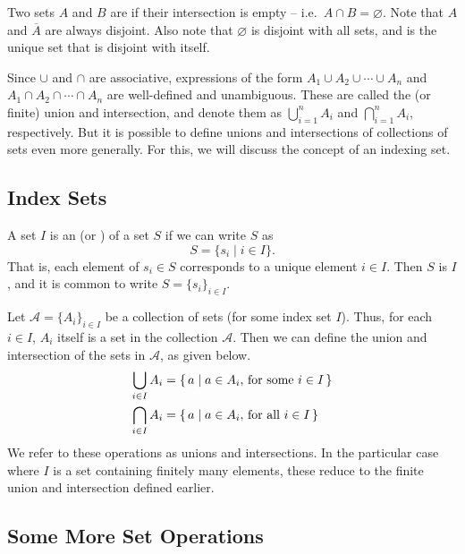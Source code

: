 Two sets $A$ and $B$ are  if their intersection is empty -- i.e.\ $A \cap B = \varnothing$. Note that $A$ and $\overline A$ are always disjoint. Also note that $\varnothing$ is disjoint with all sets, and is the unique set that is disjoint with itself.

Since $\cup$ and $\cap$ are associative, expressions of the form $A_1 \cup A_2 \cup \cdots \cup A_n$ and $A_1 \cap A_2 \cap \cdots \cap A_n$ are well-defined and unambiguous. These are called the  (or finite) union and intersection, and denote them as $\bigcup_{i=1}^n A_i$ and $\bigcap_{i=1}^n A_i$, respectively. But it is possible to define unions and intersections of collections of sets even more generally. For this, we will discuss the concept of an indexing set.

\subsection{Index Sets}\label{subsec:IndexSets}

A set $I$ is an  (or ) of a set $S$ if we can write $S$ as
\begin{equation*}
S = \{ s_i \mid i \in I\}.
\end{equation*}
That is, each element of $s_i \in S$ corresponds to a unique element $i \in I$. Then $S$ is  $I$, and it is common to write $S = \{ s_i \}_{i \in I}$.

Let $\mathcal A = \{ A_i \}_{i \in I}$ be a collection of sets (for some index set $I$). Thus, for each $i \in I$, $A_i$ itself is a set in the collection $\mathcal A$. Then we can define the union and intersection of the sets in $\mathcal A$, as given below.
\begin{align*}
\bigcup_{i \in I} A_i & = \qty{\, a \mid a \in A_i,\, \text{for some}~i \in I \,} \\
\bigcap_{i \in I} A_i & = \qty{\, a \mid a \in A_i,\, \text{for all}~ i \in I \,}
\end{align*}
We refer to these operations as  unions and intersections. In the particular case where $I$ is a set containing finitely many elements, these reduce to the finite union and intersection defined earlier.

\subsection{Some More Set Operations}\label{subsec:MoreSetOps}

